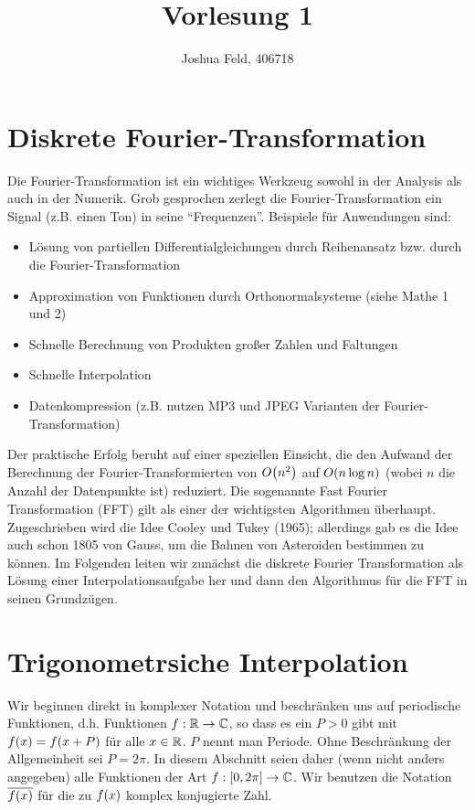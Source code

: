 \documentclass{lecture}
\institute{Applied and Computational Mathematics}
\title{Vorlesung 1}
\author{Joshua Feld, 406718}
\begin{document}
    \maketitle


    \section*{Diskrete Fourier-Transformation}

    Die Fourier-Transformation ist ein wichtiges Werkzeug sowohl in der Analysis als auch in der Numerik.
    Grob gesprochen zerlegt die Fourier-Transformation ein Signal (z.B. einen Ton) in seine ``Frequenzen''.
    Beispiele für Anwendungen sind:
    \begin{itemize}
        \item Lösung von partiellen Differentialgleichungen durch Reihenansatz bzw. durch die Fourier-Transformation
        \item Approximation von Funktionen durch Orthonormalsysteme (siehe Mathe 1 und 2)
        \item Schnelle Berechnung von Produkten großer Zahlen und Faltungen
        \item Schnelle Interpolation
        \item Datenkompression (z.B. nutzen MP3 und JPEG Varianten der Fourier-Transformation)
    \end{itemize}
    Der praktische Erfolg beruht auf einer speziellen Einsicht, die den Aufwand der Berechnung der Fourier-Transformierten von \(O\parentheses*{n^2}\) auf \(O\parentheses*{n\log n}\) (wobei \(n\) die Anzahl der Datenpunkte ist) reduziert.
    Die sogenannte Fast Fourier Transformation (FFT) gilt als einer der wichtigsten Algorithmen überhaupt.
    Zugeschrieben wird die Idee Cooley und Tukey (1965); allerdings gab es die Idee auch schon 1805 von Gauss, um die Bahnen von Asteroiden bestimmen zu können.
    Im Folgenden leiten wir zunächst die diskrete Fourier Transformation als Lösung einer Interpolationsaufgabe her und dann den Algorithmus für die FFT in seinen Grundzügen.


    \section*{Trigonometrsiche Interpolation}

    Wir beginnen direkt in komplexer Notation und beschränken uns auf periodische Funktionen, d.h. Funktionen \(f: \R \to \C\), so dass es ein \(P > 0\) gibt mit \(f\parentheses*{x} = f\parentheses*{x + P}\) für alle \(x \in \R\).
    \(P\) nennt man Periode.
    Ohne Beschränkung der Allgemeinheit sei \(P = 2\pi\).
    In diesem Abschnitt seien daher (wenn nicht anders angegeben) alle Funktionen der Art \(f: \brackets*{0, 2\pi} \to \C\).
    Wir benutzen die Notation \(\overline{f\parentheses*{x}}\) für die zu \(f\parentheses*{x}\) komplex konjugierte Zahl.
\end{document}
